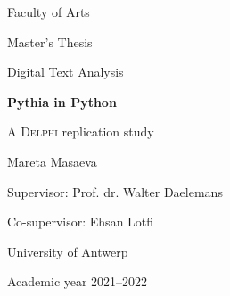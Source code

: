 \thispagestyle{plain}
    \begin{center}
    
        \vspace*{1cm}

        \large
        Faculty of Arts
        
        \vspace{0.5cm}
        Master’s Thesis 
        
        \vspace{0.5cm}
        Digital Text Analysis 
        
       \vspace{1.5cm}
            
        \Huge
        \textbf{Pythia in Python}
            
        \vspace{0.5cm}
        \LARGE
        A \textsc{Delphi} replication study
            
        \vspace{1.5cm}
        
        \Large    
        Mareta Masaeva
        
        \vspace{0.5cm}
        
        \large
        Supervisor: Prof. dr. Walter Daelemans
        
        \vspace{0.5cm}
        Co-supervisor: Ehsan Lotfi
        
        \vspace{0.5cm}
        
        \vspace{1cm}
        University of Antwerp
        
        \vspace{1cm}   
        Academic year 2021–2022
            
    \end{center}